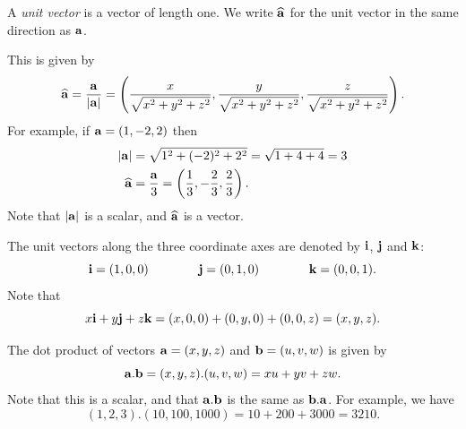 \documentclass[reqno]{amsart}
\theoremstyle{definition}
\begin{document}
A \emph{unit vector} is a vector of length one.  We write $\widehat{\mathbf{a}}$ for
the unit vector in the same direction as $\mathbf{a}$.  
\begin{center}
\end{center}
This is given by
\[ \widehat{\mathbf{a}} = \frac{\mathbf{a}}{|\mathbf{a}|} = 
    \left(\frac{x}{\sqrt{x^2+y^2+z^2}},
          \frac{y}{\sqrt{x^2+y^2+z^2}},
          \frac{z}{\sqrt{x^2+y^2+z^2}}\right).
\]
For example, if $\mathbf{a}=(1,-2,2)$ then
\begin{align*}
 |\mathbf{a}| &= \sqrt{1^2+(-2)^2+2^2} = \sqrt{1+4+4} = 3 \\
 \widehat{\mathbf{a}} &= \frac{\mathbf{a}}{3} =
          \left(\frac{1}{3},-\frac{2}{3},\frac{2}{3}\right).
\end{align*}
Note that $|\mathbf{a}|$ is a scalar, and $\widehat{\mathbf{a}}$ is a vector.   

The unit vectors along the three coordinate axes are denoted by $\mathbf{i}$,
$\mathbf{j}$ and $\mathbf{k}$:
\[ \mathbf{i} = (1,0,0) \hspace{4em}
   \mathbf{j} = (0,1,0) \hspace{4em}
   \mathbf{k} = (0,0,1).
\]
Note that
\[ x\mathbf{i} + y\mathbf{j} +z\mathbf{k} = (x,0,0) + (0,y,0) + (0,0,z) = (x,y,z). \]

The dot product of vectors $\mathbf{a}=(x,y,z)$ and $\mathbf{b}=(u,v,w)$ is given by 
\[ \mathbf{a} . \mathbf{b} = (x,y,z).(u,v,w) = xu+yv+zw. \]
Note that this is a scalar, and that $\mathbf{a}.\mathbf{b}$ is the same as
$\mathbf{b}.\mathbf{a}$.  For example, we have 
\[ (1,2,3) . (10,100,1000) = 10+200+3000 = 3210. \]
\end{document}
